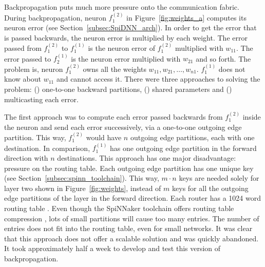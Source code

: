 \documentclass[]{article}
\begin{document}
Backpropagation puts much more pressure onto the communication
fabric.
During backpropagation, neuron $f^{(2)}_1$ in
Figure~\ref{fig:weights_a} computes its neuron error (see
Section~\ref{subsec:SpiDNN_arch}).
In order to get the error that is passed backwards, the neuron error
is multiplied by each weight.
The error passed from $f^{(2)}_1$ to $f^{(1)}_1$ is the neuron error
of $f^{(2)}_1$ multiplied with $w_{11}$.
The error passed to $f^{(1)}_2$ is the neuron error multiplied with
$w_{21}$ and so forth.
The problem is, neuron $f^{(2)}_1$ owns all the weights
$w_{11}, w_{21}, \dots, w_{n1}$.
$f^{(1)}_1$ does not know about $w_{11}$ and cannot access it.
There were three approaches to solving the problem:
() one-to-one backward partitions,
() shared parameters and ()
multicasting each error.

The first approach was to compute each error passed backwards
from $f^{(2)}_1$ inside the neuron and send each error successively,
via a one-to-one outgoing edge partition.
This way, $f^{(2)}_1$ would have $n$ outgoing edge partitions, each
with one destination.
In comparison, $f^{(1)}_1$ has one outgoing edge partition in the
forward direction with $n$ destinations.
This approach has one major disadvantage: pressure on the routing
table.
Each outgoing edge partition has one unique key
(see Section~\ref{subsec:spinn_toolchain}).
This way, $m \cdot n$ keys are needed solely for layer two shown in
Figure~\ref{fig:weights}, instead of
$m$ keys for all the outgoing edge partitions of the layer in the
forward direction.
Each router has a 1024 word routing table
\citep{navaridas_et_al_2009}.
Even though the SpiNNaker toolchain offers routing table compression
\citep{heathcote_2016}, lots of small partitions will cause too many
entries.
The number of entries does not fit into the routing table, even for
small networks.
It was clear that this approach does not offer a scalable solution
and was quickly abandoned.
It took approximately half a week to develop and test this version of
backpropagation.
\end{document}

